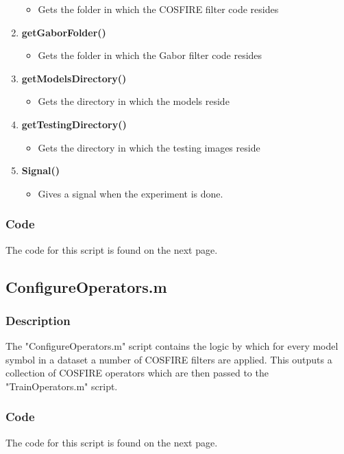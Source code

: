 \begin{enumerate}
\begin{itemize}
        \item Gets the folder in which the COSFIRE filter code resides
    \end{itemize}
    \item {\bf getGaborFolder()}
    \begin{itemize}
        \item Gets the folder in which the Gabor filter code resides
    \end{itemize}
    \item {\bf getModelsDirectory()}
    \begin{itemize}
        \item Gets the directory in which the models reside
    \end{itemize}
    \item {\bf getTestingDirectory()}
    \begin{itemize}
        \item Gets the directory in which the testing images reside
    \end{itemize}
    \item {\bf Signal()}
    \begin{itemize}
        \item Gives a signal when the experiment is done.
    \end{itemize}    
\end{enumerate}
\subsubsection{Code}
The code for this script is found on the next page.
\vspace{133.3mm}



\subsection{ConfigureOperators.m}
\subsubsection{Description}
The "ConfigureOperators.m" script contains the logic by which for every model symbol in a dataset a number of COSFIRE filters are applied. This outputs a collection of COSFIRE operators which are then passed to the "TrainOperators.m" script.
\subsubsection{Code}
The code for this script is found on the next page.
\vspace{133.3mm}

